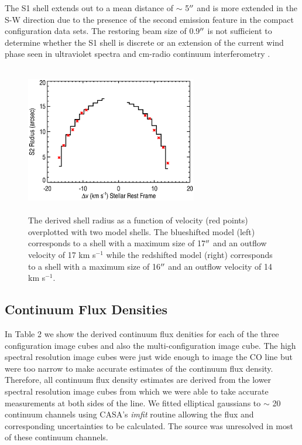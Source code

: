 \documentclass[apj]{emulateapj}
\begin{document}
The S1 shell extends out to a mean distance of $\sim$ 5$\mbox{$^{\prime\prime}$}$ and is more extended in the S-W direction due to the presence of the second emission feature in the compact configuration data sets. The restoring beam size of 0.9$\mbox{$^{\prime\prime}$}$ is not sufficient to determine whether the S1 shell is discrete or an extension of the current wind phase seen in ultraviolet spectra \citep{1997ApJ...479..970C} and cm-radio continuum interferometry \citep{1998Natur.392..575L, harper_2001}.

\begin{figure}
\includegraphics[trim=45pt 0pt 80pt 10pt, width=7.5cm, height=6.5cm]{s2_size.eps}
\caption{The derived shell radius as a function of velocity (red points) overplotted with two model shells. The blueshifted model (left) corresponds to a shell with a maximum size of 17$\mbox{$^{\prime\prime}$}$ and an outflow velocity of 17 km s${}^{-1}$ while the redshifted model (right) corresponds to a shell with a maximum size of 16$\mbox{$^{\prime\prime}$}$ and an outflow velocity of 14 km s${}^{-1}$.}
\label{fig:fig4}
\end{figure}

\subsection{Continuum Flux Densities} \label{results4} 

In Table 2 we show the derived continuum flux denities for each of the three configuration image cubes and also the multi-configuration image cube. The high spectral resolution image cubes were just wide enough to image the CO line but were too narrow to make accurate estimates of the continuum flux density. Therefore, all continuum flux density estimates are derived from the lower spectral resolution image cubes from which we were able to take accurate measurements at both sides of the line. We fitted elliptical gaussians to $\sim$ 20 continuum channels using CASA's \textit{imfit} routine allowing the flux and corresponding uncertainties to be calculated. The source was unresolved in most of these continuum channels. 
\end{document}
